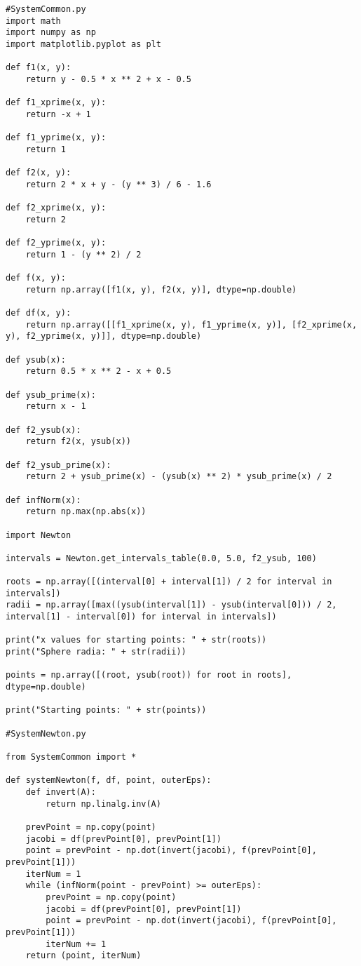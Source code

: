 \documentclass[14pt, a4paper]{article}
\begin{document}
\begin{lstlisting}
#SystemCommon.py
import math
import numpy as np
import matplotlib.pyplot as plt

def f1(x, y):
    return y - 0.5 * x ** 2 + x - 0.5

def f1_xprime(x, y):
    return -x + 1

def f1_yprime(x, y):
    return 1

def f2(x, y):
    return 2 * x + y - (y ** 3) / 6 - 1.6

def f2_xprime(x, y):
    return 2

def f2_yprime(x, y):
    return 1 - (y ** 2) / 2

def f(x, y):
    return np.array([f1(x, y), f2(x, y)], dtype=np.double)

def df(x, y):
    return np.array([[f1_xprime(x, y), f1_yprime(x, y)], [f2_xprime(x, y), f2_yprime(x, y)]], dtype=np.double)

def ysub(x):
    return 0.5 * x ** 2 - x + 0.5

def ysub_prime(x):
    return x - 1

def f2_ysub(x):
    return f2(x, ysub(x))

def f2_ysub_prime(x):
    return 2 + ysub_prime(x) - (ysub(x) ** 2) * ysub_prime(x) / 2

def infNorm(x):
    return np.max(np.abs(x))

import Newton

intervals = Newton.get_intervals_table(0.0, 5.0, f2_ysub, 100)

roots = np.array([(interval[0] + interval[1]) / 2 for interval in intervals])
radii = np.array([max((ysub(interval[1]) - ysub(interval[0])) / 2, interval[1] - interval[0]) for interval in intervals])

print("x values for starting points: " + str(roots))
print("Sphere radia: " + str(radii))

points = np.array([(root, ysub(root)) for root in roots], dtype=np.double)

print("Starting points: " + str(points))

#SystemNewton.py

from SystemCommon import *

def systemNewton(f, df, point, outerEps):
    def invert(A):
        return np.linalg.inv(A)
    
    prevPoint = np.copy(point)
    jacobi = df(prevPoint[0], prevPoint[1])
    point = prevPoint - np.dot(invert(jacobi), f(prevPoint[0], prevPoint[1]))
    iterNum = 1
    while (infNorm(point - prevPoint) >= outerEps):
        prevPoint = np.copy(point)
        jacobi = df(prevPoint[0], prevPoint[1])
        point = prevPoint - np.dot(invert(jacobi), f(prevPoint[0], prevPoint[1]))
        iterNum += 1
    return (point, iterNum)
        

\end{lstlisting}
\end{document}
